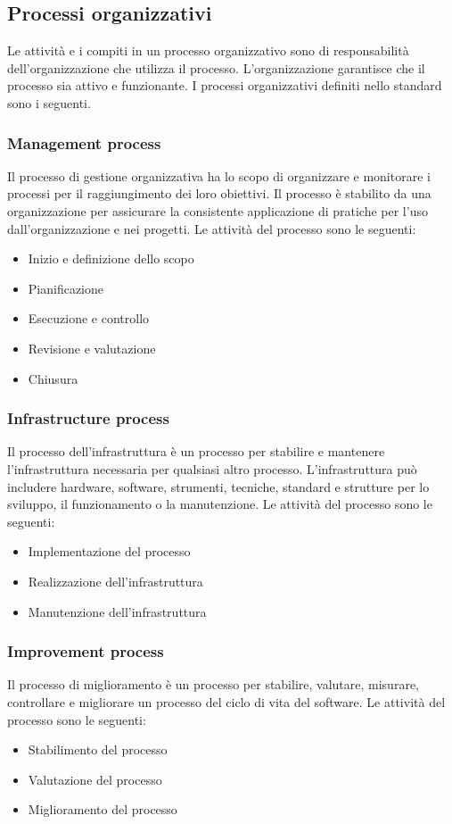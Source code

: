 \subsection{Processi organizzativi}
Le attività e i compiti in un processo organizzativo sono di responsabilità dell'organizzazione che utilizza il processo. L'organizzazione garantisce che il processo sia attivo e funzionante.
I processi organizzativi definiti nello standard sono i seguenti.

\subsubsection{Management process}
Il processo di gestione organizzativa ha lo scopo di organizzare e monitorare i processi per il raggiungimento dei loro obiettivi. Il processo è stabilito da una organizzazione per assicurare la consistente applicazione di pratiche per l'uso dall'organizzazione e nei progetti.
Le attività del processo sono le seguenti:
\begin{itemize}
\item Inizio e definizione dello scopo
\item Pianificazione 
\item Esecuzione e controllo
\item Revisione e valutazione
\item Chiusura
\end{itemize}
\subsubsection{Infrastructure process}
Il processo dell'infrastruttura è un processo per stabilire e mantenere l'infrastruttura necessaria per qualsiasi altro processo. L'infrastruttura può includere hardware, software, strumenti, tecniche, standard e strutture per lo sviluppo, il funzionamento o la manutenzione.
Le attività del processo sono le seguenti:
\begin{itemize}
\item Implementazione del processo
\item Realizzazione dell'infrastruttura
\item Manutenzione dell'infrastruttura
\end{itemize}

\subsubsection{Improvement process}
Il processo di miglioramento è un processo per stabilire, valutare, misurare, controllare e migliorare un processo del ciclo di vita del software.
Le attività del processo sono le seguenti:
\begin{itemize}
\item Stabilimento del processo
\item Valutazione del processo
\item Miglioramento del processo
\end{itemize}

